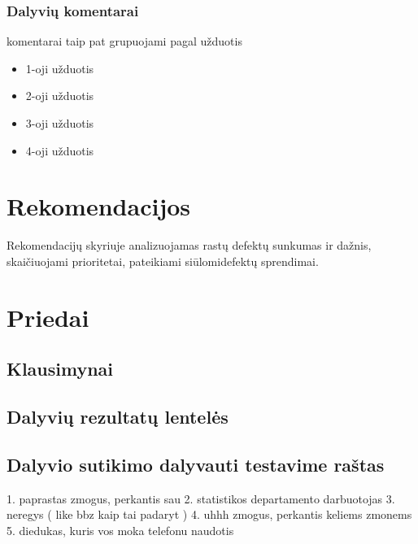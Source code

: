 \documentclass{VUMIFPSkursinis}
\begin{document}
\subsubsection{Dalyvių komentarai}
komentarai taip pat grupuojami pagal užduotis
	\begin{itemize}
	\item 1-oji užduotis
	\item 2-oji užduotis
	\item 3-oji užduotis
	\item 4-oji užduotis
	\end{itemize}

\section{Rekomendacijos}
Rekomendacijų skyriuje analizuojamas rastų defektų sunkumas ir dažnis, skaičiuojami prioritetai, pateikiami siūlomidefektų sprendimai.

\section{Priedai}
\subsection{Klausimynai}
\subsection{Dalyvių rezultatų lentelės}
\subsection{Dalyvio sutikimo dalyvauti testavime raštas}





1. paprastas zmogus, perkantis sau
2. statistikos departamento darbuotojas
3. neregys ( like bbz kaip tai padaryt )
4. uhhh zmogus, perkantis keliems zmonems
5. diedukas, kuris vos moka telefonu naudotis













\printbibliography[heading=bibintoc, title=Šaltiniai]  %
\end{document}
